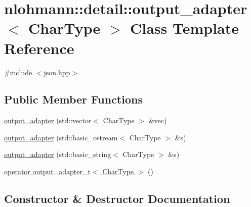 \hypertarget{classnlohmann_1_1detail_1_1output__adapter}{}\section{nlohmann\+:\+:detail\+:\+:output\+\_\+adapter$<$ Char\+Type $>$ Class Template Reference}
\label{classnlohmann_1_1detail_1_1output__adapter}


{\ttfamily \#include $<$json.\+hpp$>$}

\subsection*{Public Member Functions}
\begin{DoxyCompactItemize}
\item 
\hyperlink{classnlohmann_1_1detail_1_1output__adapter_a117bda35bc3de85fd2f5f2153d9705b4}{output\+\_\+adapter} (std\+::vector$<$ Char\+Type $>$ \&vec)
\item 
\hyperlink{classnlohmann_1_1detail_1_1output__adapter_ac086bc101f246eb815e46f17a9e68a4a}{output\+\_\+adapter} (std\+::basic\+\_\+ostream$<$ Char\+Type $>$ \&s)
\item 
\hyperlink{classnlohmann_1_1detail_1_1output__adapter_a07f996a817ffb420022cea56425f7d5c}{output\+\_\+adapter} (std\+::basic\+\_\+string$<$ Char\+Type $>$ \&s)
\item 
\hyperlink{classnlohmann_1_1detail_1_1output__adapter_adee7a0e124f483d9945b8b85c73d7957}{operator output\+\_\+adapter\+\_\+t$<$ Char\+Type $>$} ()
\end{DoxyCompactItemize}


\subsection{Constructor \& Destructor Documentation}
